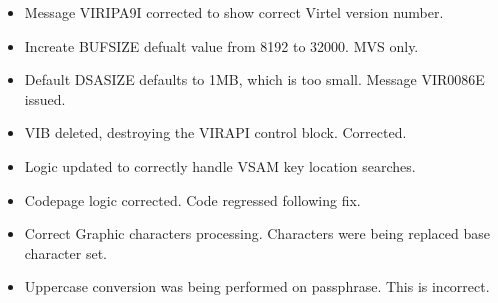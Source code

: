 \documentclass[letterpaper,10pt,english]{sphinxmanual}
\begin{document}
\begin{itemize}
\item {} 
Message VIRIPA9I corrected to show correct Virtel version number.

\end{itemize}

\begin{itemize}
\item {} 
Increate BUFSIZE defualt value from 8192 to 32000. MVS only.

\end{itemize}

\begin{itemize}
\item {} 
Default DSASIZE defaults to 1MB, which is too small. Message VIR0086E issued.

\end{itemize}

\begin{itemize}
\item {} 
VIB deleted, destroying the VIRAPI control block. Corrected.

\end{itemize}

\begin{itemize}
\item {} 
Logic updated to correctly handle VSAM key location searches.

\end{itemize}

\begin{itemize}
\item {} 
Codepage logic corrected. Code regressed following fix.

\end{itemize}

\begin{itemize}
\item {} 
Correct Graphic characters processing. Characters were being replaced base character set.

\end{itemize}

\begin{itemize}
\item {} 
Uppercase conversion was being performed on passphrase. This is incorrect.

\end{itemize}
\end{document}
